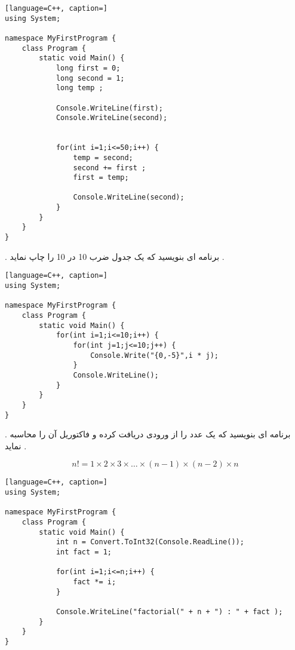 \documentclass[12pt]{article}
\begin{document}
\begin{latin}
\begin{lstlisting}[language=C++, caption=]
using System;

namespace MyFirstProgram {
	class Program {
		static void Main() {
			long first = 0;
			long second = 1;
			long temp ;
			
			Console.WriteLine(first);
			Console.WriteLine(second);
			

			for(int i=1;i<=50;i++) {
				temp = second;
				second += first ;
				first = temp;
				
				Console.WriteLine(second);
			}
		}
	}
}
\end{lstlisting}
\end{latin}







\newpage

 . برنامه ای بنویسید که یک جدول ضرب 10 در 10 را چاپ نماید .






\begin{latin}
\begin{lstlisting}[language=C++, caption=]
using System;

namespace MyFirstProgram {
	class Program {
		static void Main() {
			for(int i=1;i<=10;i++) {
				for(int j=1;j<=10;j++) {
					Console.Write("{0,-5}",i * j);
				}
				Console.WriteLine();
			}
		}
	}
}
\end{lstlisting}
\end{latin}














\newpage


 . برنامه ای بنویسید که یک عدد را از ورودی دریافت کرده و فاکتوریل آن را محاسبه نماید .

\begin{tcolorbox}
$$
n ! = 1 \times 2 \times 3 \times \dots \times (n-1) \times (n-2) \times n
$$
\end{tcolorbox}





\begin{latin}
\begin{lstlisting}[language=C++, caption=]
using System;

namespace MyFirstProgram {
	class Program {
		static void Main() {
			int n = Convert.ToInt32(Console.ReadLine());
			int fact = 1;
			
			for(int i=1;i<=n;i++) {
				fact *= i;
			}
			
			Console.WriteLine("factorial(" + n + ") : " + fact );
		}
	}
}
\end{lstlisting}
\end{latin}
\end{document}
